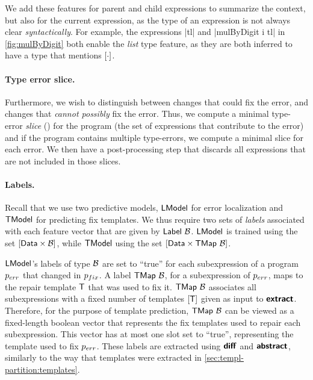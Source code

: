 We add these features for parent and child expressions to summarize the context,
but also for the current expression, as the type of an expression is not always
clear \emph{syntactically}. For example, the expressions |tl| and
|mulByDigit i tl| in \autoref{fig:mulByDigit} both enable the \emph{list} type
feature, as they are both inferred to have a type that mentions $[\cdot]$.

\paragraph{Type error slice.}
Furthermore, we wish to distinguish between changes that could fix the error,
and changes that \emph{cannot possibly} fix the error. Thus, we compute a
minimal type-error \emph{slice} (\eg \citep{Tip2001-qp,Haack2003-vc}) for the
program (\ie the set of expressions that contribute to the error) and if the
program contains multiple type-errors, we compute a minimal slice for each
error. We then have a post-processing step that discards all expressions that
are not included in those slices.

\paragraph{Labels.}
Recall that we use two predictive models, $\mathsf{LModel}$ for error localization and
$\mathsf{TModel}$ for predicting fix templates. We thus require two sets of
\emph{labels} associated with each feature vector that are given by
$\mathsf{Label}\ \mathcal{B}$. $\mathsf{LModel}$ is trained using the set $[\mathsf{Data} \times
\mathcal{B}]$, while $\mathsf{TModel}$ using the set $[\mathsf{Data} \times
\mathsf{TMap}\ \mathcal{B}]$.

$\mathsf{LModel}$'s labels of type $\mathcal{B}$ are set to ``true'' for each subexpression
of a program $p_{err}$ that changed in $p_{fix}$. A label $\mathsf{TMap}\ \mathcal{B}$, for a
subexpression of $p_{err}$, maps to the repair template $\mathsf{T}$ that was used to fix
it. $\mathsf{TMap}\ \mathcal{B}$ associates all subexpressions with a fixed number of
templates $[\mathsf{T}]$ given as input to $\bm{\mathsf{extract}}$. Therefore, for the
purpose of template prediction, $\mathsf{TMap}\ \mathcal{B}$ can be viewed as a
fixed-length boolean vector that represents the fix templates used to repair
each subexpression. This vector has at most one slot set to ``true'',
representing the template used to fix $p_{err}$. These labels are extracted using
$\bm{\mathsf{diff}}$ and $\bm{\mathsf{abstract}}$, similarly to the way that templates were extracted
in \autoref{sec:templ-partition:templates}.


